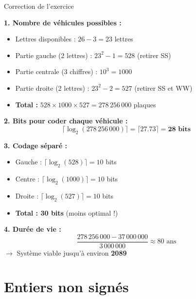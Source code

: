 \documentclass[aspectratio=1610]{beamer}
\begin{document}
\begin{frame}{Correction de l'exercice}

  \textbf{1. Nombre de véhicules possibles :}
  \pause
  \begin{itemize}
    \item Lettres disponibles : $26 - 3 = 23$ lettres
    \item Partie gauche (2 lettres) : $23^2 - 1 = 528$ (retirer SS)
    \item Partie centrale (3 chiffres) : $10^3 = 1000$
    \item Partie droite (2 lettres) : $23^2 - 2 = 527$ (retirer SS et WW)
    \item \textbf{Total :} $528 \times 1000 \times 527 = 278\,256\,000$ plaques
  \end{itemize}

  \pause
  \textbf{2. Bits pour coder chaque véhicule :}
  \[
    \lceil \log_2(278\,256\,000) \rceil = \lceil 27.73 \rceil = \textbf{28 bits}
  \]

  \pause
  \textbf{3. Codage séparé :}
  \begin{itemize}
    \item Gauche : $\lceil \log_2(528) \rceil = 10$ bits
    \item Centre : $\lceil \log_2(1000) \rceil = 10$ bits
    \item Droite : $\lceil \log_2(527) \rceil = 10$ bits
    \item \textbf{Total : 30 bits} (moins optimal !)
  \end{itemize}

  \pause
  \textbf{4. Durée de vie :}
  \[
    \frac{278\,256\,000 - 37\,000\,000}{3\,000\,000} \approx 80 \text{ ans}
  \]
  $\rightarrow$ Système viable jusqu'à environ \textbf{2089}

\end{frame}

\section{Entiers non signés}
\end{document}
